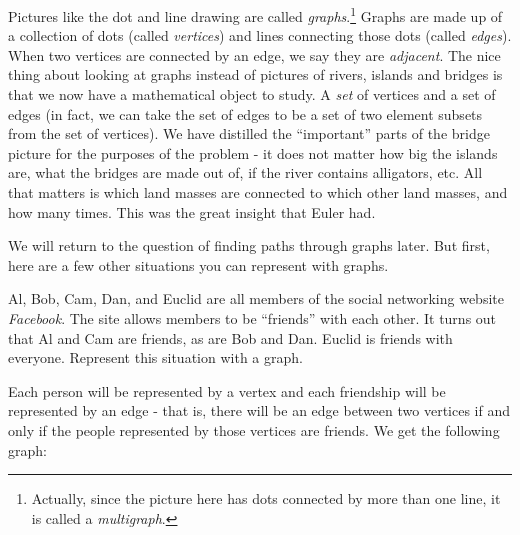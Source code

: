 \documentclass[12pt]{article}
\begin{document}
Pictures like the dot and line drawing are called {\em graphs}.\footnote{Actually, since the picture here has dots connected by more than one line, it is called a \emph{multigraph}.}  Graphs are made up of a collection of dots (called {\em vertices}) and lines connecting those dots (called \emph{edges}).  When two vertices are connected by an edge, we say they are \emph{adjacent}.  The nice thing about looking at graphs instead of pictures of rivers, islands and bridges is that we now have a mathematical object to study.  A {\em set} of vertices and a set of edges (in fact, we can take the set of edges to be a set of two element subsets from the set of vertices).  We have distilled the ``important'' parts of the bridge picture for the purposes of the problem - it does not matter how big the islands are, what the bridges are made out of, if the river contains alligators, etc.  All that matters is which land masses are connected to which other land masses, and how many times.  This was the great insight that Euler had.

We will return to the question of finding paths through graphs later.  But first, here are a few other situations you can represent with graphs.

\begin{example}
  Al, Bob, Cam, Dan, and Euclid are all members of the social networking website {\em Facebook}.  The site allows members to be ``friends'' with each other.  It turns out that Al and Cam are friends, as are Bob and Dan.  Euclid is friends with everyone.  Represent this situation with a graph.
  \begin{solution}
    Each person will be represented by a vertex and each friendship will be represented by an edge - that is, there will be an edge between two vertices if and only if the people represented by those vertices are friends.  We get the following graph:
    
    \begin{center}
    \end{center}
  \end{solution}

\end{example}
\end{document}
